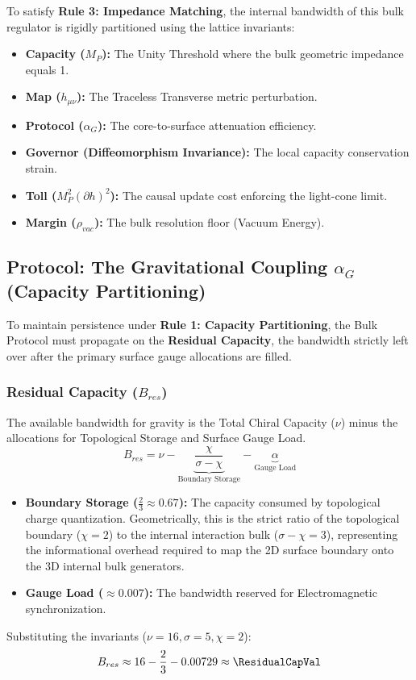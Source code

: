 To satisfy \textbf{Rule 3: Impedance Matching}, the internal bandwidth of this bulk regulator is rigidly partitioned using the lattice invariants:

\begin{itemize}
    \item \textbf{Capacity ($M_P$):} The Unity Threshold where the bulk geometric impedance equals 1.
    \item \textbf{Map ($h_{\mu\nu}$):} The Traceless Transverse metric perturbation.
    \item \textbf{Protocol ($\alpha_G$):} The core-to-surface attenuation efficiency.
    \item \textbf{Governor (Diffeomorphism Invariance):} The local capacity conservation strain.
    \item \textbf{Toll ($M_P^2 (\partial h)^2$):} The causal update cost enforcing the light-cone limit.
    \item \textbf{Margin ($\rho_{vac}$):} The bulk resolution floor (Vacuum Energy).
\end{itemize}

\subsection{Protocol: The Gravitational Coupling \texorpdfstring{$\alpha_G$}{alphaG} (Capacity Partitioning)}
To maintain persistence under \textbf{Rule 1: Capacity Partitioning}, the Bulk Protocol must propagate on the \textbf{Residual Capacity}, the bandwidth strictly left over after the primary surface gauge allocations are filled.

\subsubsection{Residual Capacity (\texorpdfstring{$B_{res}$}{Bres})}
The available bandwidth for gravity is the Total Chiral Capacity ($\nu$) minus the allocations for Topological Storage and Surface Gauge Load.
\begin{equation}
B_{res} = \nu - \underbrace{\frac{\chi}{\sigma-\chi}}_{\text{Boundary Storage}} - \underbrace{\alpha}_{\text{Gauge Load}}
\end{equation}
\begin{itemize}
    \item \textbf{Boundary Storage ($\frac{2}{3} \approx 0.67$):} The capacity consumed by topological charge quantization. Geometrically, this is the strict ratio of the topological boundary ($\chi=2$) to the internal interaction bulk ($\sigma-\chi=3$), representing the informational overhead required to map the 2D surface boundary onto the 3D internal bulk generators.
    \item \textbf{Gauge Load ($\approx 0.007$):} The bandwidth reserved for Electromagnetic synchronization.
\end{itemize}
Substituting the invariants ($\nu=16, \sigma=5, \chi=2$):
\begin{equation}
B_{res} \approx 16 - \frac{2}{3} - 0.00729 \approx \mathbf{\ResidualCapVal}
\end{equation}

